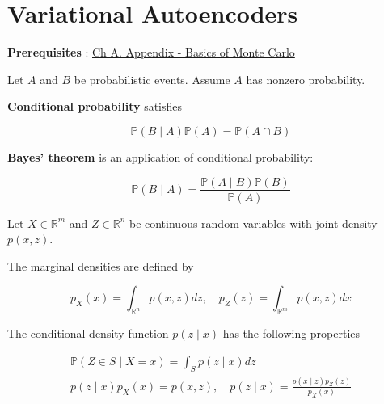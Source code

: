 \chapter{Variational Autoencoders}

\textbf{Prerequisites} : \href{./13.md}{Ch A. Appendix - Basics of Monte Carlo}

\begin{concept}
    Let $A$ and $B$ be probabilistic events. Assume $A$ has nonzero probability.

    \textbf{Conditional probability} satisfies

    $$
    \mathbb{P}(B \mid A) \mathbb{P}(A)=\mathbb{P}(A \cap B)
    $$

    \textbf{Bayes' theorem} is an application of conditional probability:

    $$
    \mathbb{P}(B \mid A)=\frac{\mathbb{P}(A \mid B) \mathbb{P}(B)}{\mathbb{P}(A)}
    $$
\end{concept}

\begin{concept}
    Let $X \in \mathbb{R}^{m}$ and $Z \in \mathbb{R}^{n}$ be continuous random variables with joint density $p(x, z)$.

    The marginal densities are defined by

    $$
    p_{X}(x)=\int_{\mathbb{R}^{n}} p(x, z) d z, \quad p_{Z}(z)=\int_{\mathbb{R}^{m}} p(x, z) d x
    $$

    The conditional density function $p(z \mid x)$ has the following properties

    $$
    \begin{gathered}
    \mathbb{P}(Z \in S \mid X=x)=\int_{S} p(z \mid x) d z \\
    p(z \mid x) p_{X}(x)=p(x, z), \quad p(z \mid x)=\frac{p(x \mid z) p_{Z}(z)}{p_{X}(x)}
    \end{gathered}
    $$
\end{concept}

